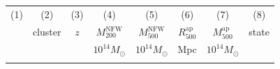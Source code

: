 \documentclass[useAMS,usenatbib]{mnras}
\begin{document}
\begin{table}
\begin{tabularx}{1.0\textwidth}{ l l r r r r r r}
 \end{tabularx}
\end{table}





\begin{table}
\centering
\begin{tabularx}{1.0\textwidth}{ l l r r r r r r}
\multicolumn{1}{c}{(1) } & \multicolumn{1}{c}{ (2) } & \multicolumn{1}{c}{ (3) } & \multicolumn{1}{c}{ (4) } & \multicolumn{1}{c}{ (5) } & \multicolumn{1}{c}{ (6) } & \multicolumn{1}{c}{ (7) } & \multicolumn{1}{c}{ (8) } \\
    & \multicolumn{1}{c}{cluster}  & \multicolumn{1}{c}{$z$} &  \multicolumn{1}{c}{ $M^\mathrm{NFW}_{200}$  } & \multicolumn{1}{c}{$M^\mathrm{NFW}_{500}$} & \multicolumn{1}{c}{ $R^\mathrm{ap}_{500}$} & \multicolumn{1}{c}{$M^\mathrm{ap}_{500}$} & state \\
    
  & & & \multicolumn{1}{c}{$10^{14} M_\odot$ } &  \multicolumn{1}{c}{$10^{14} M_\odot$ } &  \multicolumn{1}{c}{ Mpc } & \multicolumn{1}{c}{$10^{14} M_\odot$ } &  \\
 
 \hline
 \\
 

\end{tabularx}
\end{table}
\end{document}
